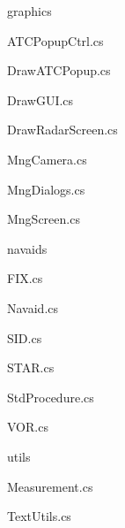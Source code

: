\begin{minipage}[t]{0.4\textwidth}
\begin{footnotesize}
\begin{description}
			\item \faFolderOpenO\ graphics
			\begin{description}
				\item \faFileCodeO\ ATCPopupCtrl.cs
				\item \faFileCodeO\ DrawATCPopup.cs
				\item \faFileCodeO\ DrawGUI.cs
				\item \faFileCodeO\ DrawRadarScreen.cs
				\item \faFileCodeO\ MngCamera.cs
				\item \faFileCodeO\ MngDialogs.cs
				\item \faFileCodeO\ MngScreen.cs		
			\end{description}
			
			\item \faFolderOpenO\ navaids
			\begin{description}
				\item \faFileCodeO\ FIX.cs
				\item \faFileCodeO\ Navaid.cs
				\item \faFileCodeO\ SID.cs
				\item \faFileCodeO\ STAR.cs
				\item \faFileCodeO\ StdProcedure.cs
				\item \faFileCodeO\ VOR.cs			
			\end{description}
			
			\item \faFolderOpenO\ utils
			\begin{description}
				\item \faFileCodeO\ Measurement.cs
				\item \faFileCodeO\ TextUtils.cs			
			\end{description}
			
		\end{description}
		
\end{footnotesize}	
\end{minipage}








\clearpage

